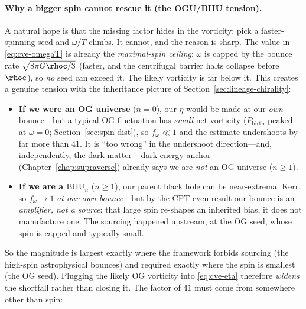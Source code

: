 \paragraph{Why a bigger spin cannot rescue it (the OGU/BHU tension).} A natural
hope is that the missing factor hides in the vorticity: pick a faster-spinning
seed and $\omega/T$ climbs. It cannot, and the reason is sharp. The value in
\eqref{eq:cve-omegaT} is already the \emph{maximal-spin ceiling}: $\omega$ is
capped by the bounce rate $\sqrt{8\pi G\rhoc/3}$ (faster, and the centrifugal
barrier halts collapse before $\rhoc$), so \emph{no} seed can exceed it. The
likely vorticity is far below it. This creates a genuine tension with the
inheritance picture of Section~\ref{sec:lineage-chirality}:
\begin{itemize}
  \item \textbf{If we were an OG universe} ($n=0$), our $\eta$ would be made at our
    \emph{own} bounce---but a typical OG fluctuation has \emph{small} net vorticity
    ($P_{\mathrm{birth}}$ peaked at $\omega=0$; Section~\ref{sec:spin-dist}), so
    $f_\omega\ll1$ and the estimate undershoots by far more than $41$. It is
    ``too wrong'' in the undershoot direction---and, independently, the
    dark-matter\,$+$\,dark-energy anchor (Chapter~\ref{chap:supraverse}) already
    says we are \emph{not} an OG universe ($n\ge1$).
  \item \textbf{If we are a $\mathrm{BHU}_n$} ($n\ge1$), our parent black hole can
    be near-extremal Kerr, so $f_\omega\to1$ \emph{at our own bounce}---but by the
    CPT-even result our bounce is an \emph{amplifier, not a source}: that large spin
    re-shapes an inherited bias, it does not manufacture one. The sourcing happened
    upstream, at the OG seed, whose spin is capped and typically small.
\end{itemize}
So the magnitude is largest exactly where the framework forbids sourcing (the
high-spin astrophysical bounces) and required exactly where the spin is smallest
(the OG seed). Plugging the likely OG vorticity into \eqref{eq:cve-eta} therefore
\emph{widens} the shortfall rather than closing it. The factor of $41$ must come
from somewhere other than spin:
